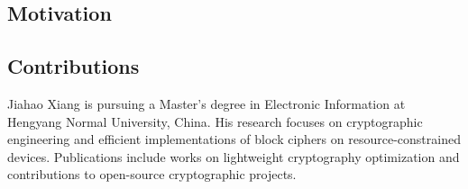 \documentclass[journal]{IEEEtran}
\begin{document}
\subsection{Motivation}


\subsection{Contributions}



\color{black}















\begin{IEEEbiography}{Jiahao Xiang}
    is pursuing a Master's degree in Electronic Information at Hengyang Normal University, China. His research focuses on cryptographic engineering and efficient implementations of block ciphers on resource-constrained devices. Publications include works on lightweight cryptography optimization and contributions to open-source cryptographic projects.
\end{IEEEbiography}
\end{document}
